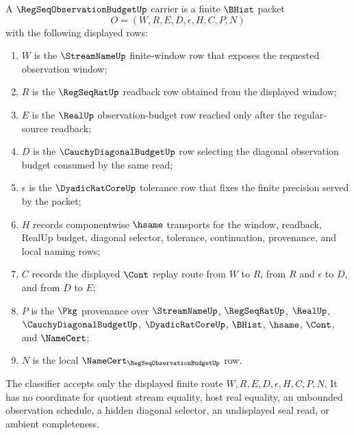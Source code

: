 \begin{definition}
\label{def:regular-observer-budget-carrier}
A $\RegSeqObservationBudgetUp$ carrier is a finite $\BHist$ packet
$$
O=(W,R,E,D,\epsilon,H,C,P,N)
$$
with the following displayed rows:
\begin{enumerate}
\item $W$ is the $\StreamNameUp$ finite-window row that exposes the requested observation window;
\item $R$ is the $\RegSeqRatUp$ readback row obtained from the displayed window;
\item $E$ is the $\RealUp$ observation-budget row reached only after the regular-source readback;
\item $D$ is the $\CauchyDiagonalBudgetUp$ row selecting the diagonal observation budget consumed by the same read;
\item $\epsilon$ is the $\DyadicRatCoreUp$ tolerance row that fixes the finite precision served by the packet;
\item $H$ records componentwise $\hsame$ transports for the window, readback, RealUp budget, diagonal selector, tolerance, continuation, provenance, and local naming rows;
\item $C$ records the displayed $\Cont$ replay route from $W$ to $R$, from $R$ and $\epsilon$ to $D$, and from $D$ to $E$;
\item $P$ is the $\Pkg$ provenance over $\StreamNameUp$, $\RegSeqRatUp$, $\RealUp$, $\CauchyDiagonalBudgetUp$, $\DyadicRatCoreUp$, $\BHist$, $\hsame$, $\Cont$, and $\NameCert$;
\item $N$ is the local $\NameCert_{\RegSeqObservationBudgetUp}$ row.
\end{enumerate}
The classifier accepts only the displayed finite route $W,R,E,D,\epsilon,H,C,P,N$. It has no coordinate for quotient stream equality, host real equality, an unbounded observation schedule, a hidden diagonal selector, an undisplayed seal read, or ambient completeness.
\end{definition}

